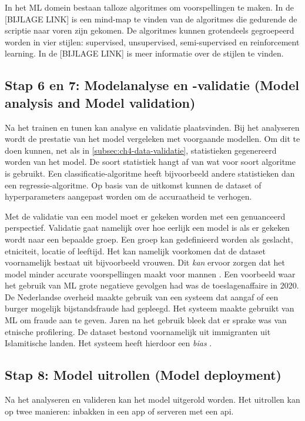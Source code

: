 In het ML domein bestaan talloze algoritmes om voorspellingen te maken. In de [BIJLAGE LINK] is een mind-map te vinden van de algoritmes die gedurende de scriptie naar voren zijn gekomen. De algoritmes kunnen grotendeels gegroepeerd worden in vier stijlen: supervised, unsupervised, semi-supervised en reinforcement learning. In de [BIJLAGE LINK] is meer informatie over de stijlen te vinden.

\subsection{Stap 6 en 7: Modelanalyse en -validatie (Model analysis and Model validation)}\label{subsec:ch4-model-analyse-en-validatie}
Na het trainen en tunen kan analyse en validatie plaatsvinden. Bij het analyseren wordt de prestatie van het model vergeleken met voorgaande modellen. Om dit te doen kunnen, net als in \autoref{subsec:ch4-data-validatie}, statistieken gegenereerd worden van het model. De soort statistiek hangt af van wat voor soort algoritme is gebruikt. Een classificatie-algoritme heeft bijvoorbeeld andere statistieken dan een regressie-algoritme. Op basis van de uitkomst kunnen de dataset of hyperparameters aangepast worden om de accuraatheid te verhogen.

Met de validatie van een model moet er gekeken worden met een genuanceerd perspectief. Validatie gaat namelijk over hoe eerlijk een model is als er gekeken wordt naar een bepaalde groep. Een groep kan gedefinieerd worden als geslacht, etniciteit, locatie of leeftijd. Het kan namelijk voorkomen dat de dataset voornamelijk bestaat uit bijvoorbeeld vrouwen. Dit \textit{kan} ervoor zorgen dat het model minder accurate voorspellingen maakt voor mannen \cite[p.~109-110]{introduction-to-machine-learning}. Een voorbeeld waar het gebruik van ML grote negatieve gevolgen had was de toeslagenaffaire in 2020. De Nederlandse overheid maakte gebruik van een systeem dat aangaf of een burger mogelijk bijstandsfraude had gepleegd. Het systeem maakte gebruikt van ML om fraude aan te geven. Jaren na het gebruik bleek dat er sprake was van etnische profilering. De dataset bestond voornamelijk uit immigranten uit Islamitische landen. Het systeem heeft hierdoor een \textit{bias} \cite{ml-fairness-dutch-syri}.

\subsection{Stap 8: Model uitrollen (Model deployment)}\label{subsec:ch4-model-uitrollen}
Na het analyseren en valideren kan het model uitgerold worden. Het uitrollen kan op twee manieren: inbakken in een app of serveren met een \acrfull{api}.

